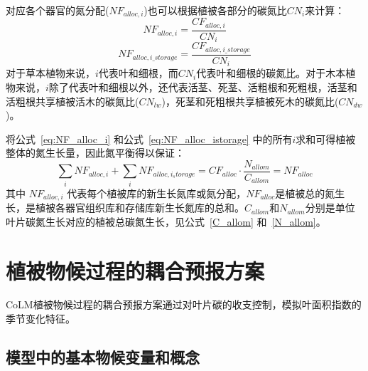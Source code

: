  对应各个器官的氮分配($NF_{alloc,i}$)也可以根据植被各部分的碳氮比$CN_i$来计算：
\begin{equation}\label{eq:NF_alloc_i}
  NF_{alloc,i} = \frac{CF_{alloc,i}}{CN_i}
\end{equation}
\begin{equation}\label{eq:NF_alloc_istorage}
  NF_{alloc,i\_storage} = \frac{CF_{alloc,i\_storage}}{CN_{i}}
\end{equation}
对于草本植物来说，$i$代表叶和细根，而$CN_{i}$代表叶和细根的碳氮比。对于木本植物来说，$i$除了代表叶和细根以外，还代表活茎、死茎、活粗根和死粗根，活茎和活粗根共享植被活木的碳氮比($CN_{lw}$)，死茎和死粗根共享植被死木的碳氮比($CN_{dw}$)。


将公式~\eqref{eq:NF_alloc_i} 和公式~\eqref{eq:NF_alloc_istorage} 中的所有$i$求和可得植被整体的氮生长量，因此氮平衡得以保证：
\begin{equation}
  \sum_{i}{NF_{alloc,i}}+\sum_{i}{NF_{alloc,i_storage}}=CF_{alloc}\cdot \frac{N_{allom}}{C_{allom}}=NF_{alloc}
\end{equation}
其中 $NF_{alloc,i}$ 代表每个植被库的新生长氮库或氮分配，$NF_{alloc}$是植被总的氮生长，是植被各器官组织库和存储库新生长氮库的总和。$C_{allom}$和$N_{allom}$分别是单位叶片碳氮生长对应的植被总碳氮生长，见公式~\eqref{C_allom} 和~\eqref{N_allom}。


\section{植被物候过程的耦合预报方案}\label{植被物候过程的耦合预报方案}
CoLM植被物候过程的耦合预报方案通过对叶片碳的收支控制，模拟叶面积指数的季节变化特征。


\subsection{模型中的基本物候变量和概念}\label{模型中的基本物候变量和概念}

